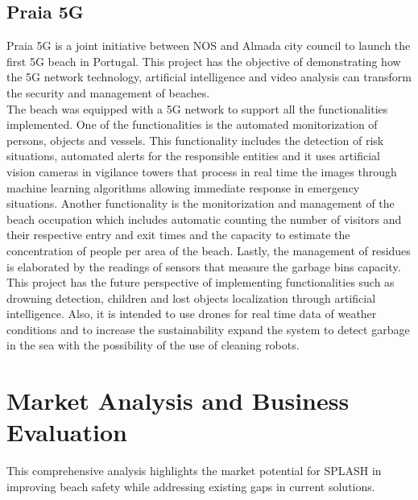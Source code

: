 \subsection{Praia 5G}
Praia 5G is a joint initiative between NOS and Almada city council to launch the first 5G beach in Portugal. This project has the objective of demonstrating how the 5G network technology, artificial intelligence and video analysis can transform the security and management of beaches.
\\
\indent The beach was equipped with a 5G network to support all the functionalities implemented. One of the functionalities is the automated monitorization of persons, objects and vessels. This functionality includes the detection of risk situations, automated alerts for the responsible entities and it uses artificial vision cameras in vigilance towers that process in real time the images through machine learning algorithms allowing immediate response in emergency situations. Another functionality is the monitorization and management of the beach occupation which includes automatic counting the number of visitors and their respective entry and exit times and the capacity to estimate the concentration of people per area of the beach. Lastly, the management of residues is elaborated by the readings of sensors that measure the garbage bins capacity.
\\
\indent This project has the future perspective of implementing functionalities such as drowning detection, children and lost objects localization through artificial intelligence. Also, it is intended to use drones for real time data of weather conditions and to increase the sustainability expand the system to detect garbage in the sea with the possibility of the use of cleaning robots.

\iffalse
\section{Others Related Projects Implemented Internationally}
\section{Technologies Of Interest}
\section{Conclusion Of The State Of The Art}
\fi

\section{Market Analysis and Business Evaluation}
This comprehensive analysis highlights the market potential for SPLASH in improving beach safety while addressing existing gaps in current solutions.

